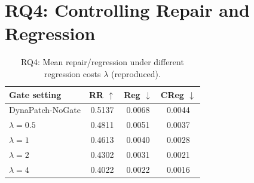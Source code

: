 \documentclass{article}
\begin{document}
\section*{RQ4: Controlling Repair and Regression}

\begin{table}[h]
\centering
\caption{RQ4: Mean repair/regression under different regression costs $\lambda$ (reproduced).}
\label{tab:repro_rq4_summary}
\small
\begin{tabular}{lccc}
\toprule
Gate setting & RR $\uparrow$ & Reg $\downarrow$ & CReg $\downarrow$ \\
\midrule
DynaPatch-NoGate & 0.5137 & 0.0068 & 0.0044 \\
$\lambda=0.5$ & 0.4811 & 0.0051 & 0.0037 \\
$\lambda=1$ & 0.4613 & 0.0040 & 0.0028 \\
$\lambda=2$ & 0.4302 & 0.0031 & 0.0021 \\
$\lambda=4$ & 0.4022 & 0.0022 & 0.0016 \\
\bottomrule
\end{tabular}
\end{table}
\end{document}
